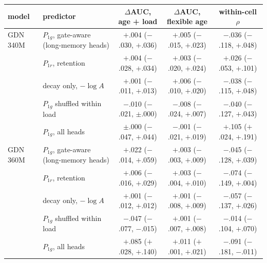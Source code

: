 \begin{tabular}{llccc}
\toprule
model & predictor & $\Delta$AUC, age + load & $\Delta$AUC, flexible age & within-cell $\rho$ \\
\midrule
GDN 340M & $P_{1g}$, gate-aware (long-memory heads) & $+$.004 ($-$.030, $+$.036) & $+$.005 ($-$.015, $+$.023) & $-$.036 ($-$.118, $+$.048) \\
 & $P_{1r}$, retention & $+$.004 ($-$.028, $+$.034) & $+$.003 ($-$.020, $+$.024) & $+$.026 ($-$.053, $+$.101) \\
 & decay only, $-\log A$ & $+$.001 ($-$.011, $+$.013) & $+$.006 ($-$.010, $+$.020) & $-$.038 ($-$.115, $+$.048) \\
 & $P_{1g}$ shuffled within load & $-$.010 ($-$.021, $\pm$.000) & $-$.008 ($-$.024, $+$.007) & $-$.040 ($-$.127, $+$.043) \\
 & $P_{1g}$, all heads & $\pm$.000 ($-$.047, $+$.044) & $-$.001 ($-$.021, $+$.019) & $+$.105 ($+$.024, $+$.191) \\
\midrule
GDN 360M & $P_{1g}$, gate-aware (long-memory heads) & $+$.022 ($-$.014, $+$.059) & $+$.003 ($-$.003, $+$.009) & $-$.045 ($-$.128, $+$.039) \\
 & $P_{1r}$, retention & $+$.006 ($-$.016, $+$.029) & $+$.003 ($-$.004, $+$.010) & $-$.074 ($-$.149, $+$.004) \\
 & decay only, $-\log A$ & $+$.001 ($-$.012, $+$.012) & $+$.001 ($-$.008, $+$.009) & $-$.057 ($-$.137, $+$.026) \\
 & $P_{1g}$ shuffled within load & $-$.047 ($-$.077, $-$.015) & $+$.001 ($-$.007, $+$.008) & $-$.014 ($-$.104, $+$.070) \\
 & $P_{1g}$, all heads & $+$.085 ($+$.028, $+$.140) & $+$.011 ($+$.001, $+$.021) & $-$.091 ($-$.181, $-$.011) \\
\bottomrule
\end{tabular}
